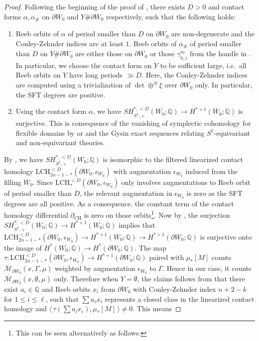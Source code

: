 \documentclass[11pt]{amsart}
\numberwithin{equation}{section}
\def\Q{{\mathbb Q}}
\def\cM{{\mathcal M}}
\def\la{\langle\,}
\def\ra{\,\rangle}
\DeclareMathOperator{\CH}{CH}
\begin{document}
\begin{proof}
Following the beginning of the proof of \cite[Proposition 4.5]{bowden2022tight}, there exists $D>0$ and contact forms $\alpha,\alpha_{\#}$ on $\partial W_0$ and $Y\#\partial W_0$ respectively, such that the following holds:
\begin{enumerate}
    \item Reeb orbits of $\alpha$ of period smaller than $D$ on $\partial W_0$ are non-degenerate and the Conley-Zehnder indices are at least $1$. Reeb orbits of $\alpha_{\#}$ of period smaller than $D$ on $Y\#\partial W_0$ are either those on $\partial W_0$ or those $\gamma^m_{h,i}$ from the handle in . In particular, we choose the contact form on $Y$ to be sufficient large, i.e.\ all Reeb orbits on $Y$ have long periods $\gg D$.  Here, the Conley-Zehnder indices are computed using a trivialization of $\det\oplus^N\xi$ over $\partial W_0$ only. In particular, the SFT degrees are positive. 
    \item Using the contact form $\alpha$, we have $SH_{S^1,+}^{*,<D}(W_0;\Q)\to H^{*+1}(W_0;\Q)$ is surjective. This is consequence of the vanishing of symplectic cohomology for flexible domains by \cite{zbMATH06035983} or \cite[Theorem 3.2]{zbMATH06864340} and the Gysin exact sequences \cite{zbMATH06247539} relating $S^1$-equivariant and non-equivariant theories.
\end{enumerate}    
By , we have $SH_{S^1,+}^{*,<D}(W_0;\Q)$ is isomorphic to the filtered linearized contact homology $\mathrm{LCH}^{<D}_{2n-1-*}(\partial W_0, \epsilon_{W_0})$ with augmentation $\epsilon_{W_0}$ induced from the filling $W_0$. Since $\mathrm{LCH}^{<D}_*(\partial W_0, \epsilon_{W_0})$ only involves augmentations to Reeb orbit of period smaller than $D$, the relevant augmentation in $\epsilon_{W_0}$ is zero as the SFT degrees are all positive. As a consequence, the constant term of the contact homology differential $\partial_{\CH}$ is zero on those orbits\footnote{This can be seen alternatively as follows:}. Now by , the surjection  $SH_{S^1,+}^{*,<D}(W_0;\Q)\to H^{*+1}(W_0;\Q)$ implies that $\mathrm{LCH}^{<D}_{2n-1-*}(\partial W_0, \epsilon_{W_0}) \to H^{*+1}(W_0;\Q)\to H^{*+1}(\partial W_0;\Q)$ is surjective onto the image of $H^*(W_0;\Q)\to H^*(\partial W_0;\Q)$. The map $\tau: \mathrm{LCH}^{<D}_{2n-1-*}(\partial W_0, \epsilon_{W_0})\to  H^{*+1}(\partial W_0;\Q)$ paired with $\mu_*[M]$ counts $\overline{\cM}_{\partial W_0}(x,\Gamma,\mu)$ weighted by augmentation $\epsilon_{W_0}$ to $\Gamma$. Hence in our case, it counts $\overline{\cM}_{\partial W_0}(x,\emptyset,\mu)$ only. Therefore when $Y=\emptyset$, the claims follows from that there exist $a_i\in \Q$ and Reeb orbits $x_i$ from $\partial W_0$ with Conley-Zehnder index $n+2-k$ for $1\le i \le \ell$, such that $\sum a_ix_i$ represents a closed class in the linearized contact homology and $\la\tau(\sum a_i x_i), \mu_*[M]\ra\ne 0$. This means

\end{proof}
\end{document}
